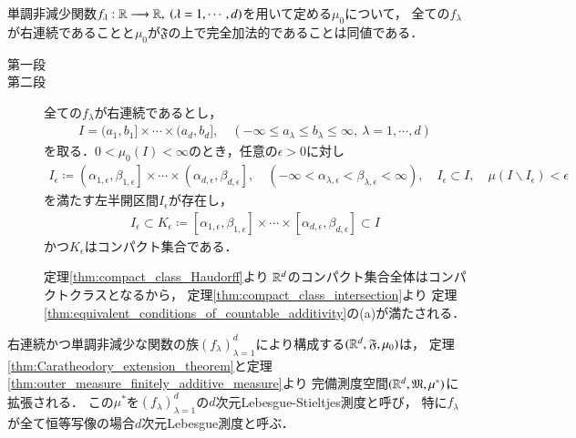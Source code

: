 	\begin{screen}
		\begin{thm}[右連続性と完全加法性]
			単調非減少関数$f_\lambda:\R \longrightarrow \R,\ (\lambda=1,\cdots,d)$を用いて定める$\mu_0$について，
			全ての$f_\lambda$が右連続であることと$\mu_0$が$\mathfrak{F}$の上で完全加法的であることは同値である．
		\end{thm}
	\end{screen}
	
	\begin{prf}\mbox{}
		\begin{description}
			\item[第一段]
				
			\item[第二段]
				全ての$f_\lambda$が右連続であるとし，
				\begin{align}
					I = (a_1,b_1] \times \cdots \times (a_d,b_d],
					\quad (-\infty \leq a_\lambda \leq b_\lambda \leq \infty,\ 
					\lambda = 1,\cdots,d)
				\end{align}
				を取る．$0 < \mu_0(I) < \infty$のとき，任意の$\epsilon > 0$に対し
				\begin{align}
					I_\epsilon \coloneqq 
					\left(\alpha_{1,\epsilon},\beta_{1,\epsilon}\right]
					\times \cdots \times
					\left(\alpha_{d,\epsilon},\beta_{d,\epsilon}\right],
					\quad (-\infty < \alpha_{\lambda,\epsilon} < \beta_{\lambda,\epsilon} < \infty),
					\quad I_\epsilon \subset I,
					\quad \mu(I \backslash I_\epsilon) < \epsilon
				\end{align}
				を満たす左半開区間$I_\epsilon$が存在し，
				\begin{align}
					I_\epsilon \subset 
					K_\epsilon \coloneqq \left[\alpha_{1,\epsilon},\beta_{1,\epsilon}\right]
					\times \cdots \times
					\left[\alpha_{d,\epsilon},\beta_{d,\epsilon}\right]
					\subset I
				\end{align}
				かつ$K_\epsilon$はコンパクト集合である．
				
				定理\ref{thm:compact_class_Haudorff}より
				$\mathbb{R}^d$のコンパクト集合全体はコンパクトクラスとなるから，
				定理\ref{thm:compact_class_intersection}より
				定理\ref{thm:equivalent_conditions_of_countable_additivity}の(a)が満たされる．
		\end{description}
	\end{prf}
	
	\begin{screen}
		\begin{dfn}
			右連続かつ単調非減少な関数の族$(f_\lambda)_{\lambda=1}^d$により構成する$(\mathbb{R}^d,\mathfrak{F},\mu_0)$は，
			定理\ref{thm:Caratheodory_extension_theorem}と定理\ref{thm:outer_measure_finitely_additive_measure}より
			完備測度空間$(\mathbb{R}^d,\mathfrak{M},\mu^*)$に拡張される．
			この$\mu^*$を$(f_\lambda)_{\lambda=1}^d$の$d$次元Lebesgue-Stieltjes測度と呼び，
			特に$f_\lambda$が全て恒等写像の場合$d$次元Lebesgue測度と呼ぶ．
		\end{dfn}
	\end{screen}
	
